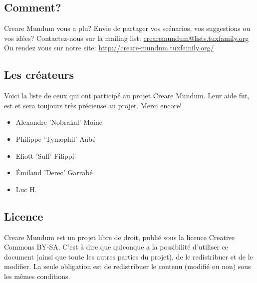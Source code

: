 \documentclass[a4paper]{article}
\begin{document}
\subsection{Comment?}
\hypertarget{participation}{}
Creare Mundum vous a plu? 
Envie de partager vos scénarios, vos suggestions ou vos idées?
\newline
Contactez-nous sur la mailing list: \href {mailto:crearemundum@lists.tuxfamily.org}{crearemundum@lists.tuxfamily.org}
\newline
Ou rendez vous sur notre site: \href {http://creare-mundum.tuxfamily.org/} {http://creare-mundum.tuxfamily.org/}
\subsection{Les créateurs}
Voici la liste de ceux qui ont participé au projet Creare Mundum. Leur aide fut, est et sera toujours très précieuse au projet. Merci encore!  
\begin{itemize}
\item Alexandre ’Nobrakal’ Moine 
\item Philippe ’Tymophil’ Aubé 
\item Eliott ’Sulf’ Filippi
\item Émiland ’Derec’ Garrabé
\item Luc H.
\end{itemize}
\subsection{Licence}
Creare Mundum est un projet libre de droit, publié sous la licence Creative Commons BY-SA. C'est à dire que quiconque a la possibilité d'utiliser ce document (ainsi que toute les autres parties du projet), de le redistribuer et de le modifier. La seule obligation est de redistribuer le contenu (modifié ou non) sous les mêmes conditions.
\end{document}
